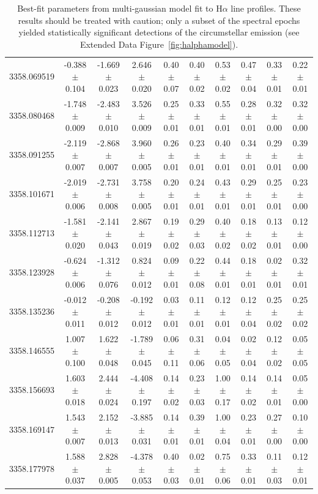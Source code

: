 \documentclass{nature3}
\begin{document}
\begin{methods}
\begin{table}
\begin{tabular}{lccccccccc}
  3358.069519 & -0.388 $\pm$ 0.104 & -1.669 $\pm$ 0.023 & 2.646 $\pm$ 0.020 & 0.40 $\pm$ 0.07 & 0.40 $\pm$ 0.02 & 0.53 $\pm$ 0.02 & 0.47 $\pm$ 0.04 & 0.33 $\pm$ 0.01 & 0.22 $\pm$ 0.01 \\
  3358.080468 & -1.748 $\pm$ 0.009 & -2.483 $\pm$ 0.010 & 3.526 $\pm$ 0.009 & 0.25 $\pm$ 0.01 & 0.33 $\pm$ 0.01 & 0.55 $\pm$ 0.01 & 0.28 $\pm$ 0.01 & 0.32 $\pm$ 0.00 & 0.32 $\pm$ 0.00 \\
  3358.091255 & -2.119 $\pm$ 0.007 & -2.868 $\pm$ 0.007 & 3.960 $\pm$ 0.005 & 0.26 $\pm$ 0.01 & 0.23 $\pm$ 0.01 & 0.40 $\pm$ 0.01 & 0.34 $\pm$ 0.01 & 0.29 $\pm$ 0.01 & 0.39 $\pm$ 0.00 \\
  3358.101671 & -2.019 $\pm$ 0.006 & -2.731 $\pm$ 0.008 & 3.758 $\pm$ 0.005 & 0.20 $\pm$ 0.01 & 0.24 $\pm$ 0.01 & 0.43 $\pm$ 0.01 & 0.29 $\pm$ 0.01 & 0.25 $\pm$ 0.01 & 0.23 $\pm$ 0.00 \\
  3358.112713 & -1.581 $\pm$ 0.020 & -2.141 $\pm$ 0.043 & 2.867 $\pm$ 0.019 & 0.19 $\pm$ 0.02 & 0.29 $\pm$ 0.03 & 0.40 $\pm$ 0.02 & 0.18 $\pm$ 0.02 & 0.13 $\pm$ 0.01 & 0.12 $\pm$ 0.00 \\
  3358.123928 & -0.624 $\pm$ 0.006 & -1.312 $\pm$ 0.076 & 0.824 $\pm$ 0.012 & 0.09 $\pm$ 0.01 & 0.22 $\pm$ 0.08 & 0.44 $\pm$ 0.01 & 0.18 $\pm$ 0.01 & 0.02 $\pm$ 0.01 & 0.32 $\pm$ 0.01 \\
  3358.135236 & -0.012 $\pm$ 0.011 & -0.208 $\pm$ 0.012 & -0.192 $\pm$ 0.012 & 0.03 $\pm$ 0.01 & 0.11 $\pm$ 0.01 & 0.12 $\pm$ 0.01 & 0.12 $\pm$ 0.04 & 0.25 $\pm$ 0.02 & 0.25 $\pm$ 0.02 \\
  3358.146555 & 1.007 $\pm$ 0.100 & 1.622 $\pm$ 0.048 & -1.789 $\pm$ 0.045 & 0.06 $\pm$ 0.11 & 0.31 $\pm$ 0.06 & 0.04 $\pm$ 0.05 & 0.02 $\pm$ 0.04 & 0.12 $\pm$ 0.02 & 0.05 $\pm$ 0.05 \\
  3358.156693 & 1.603 $\pm$ 0.018 & 2.444 $\pm$ 0.024 & -4.408 $\pm$ 0.197 & 0.14 $\pm$ 0.02 & 0.23 $\pm$ 0.03 & 1.00 $\pm$ 0.17 & 0.14 $\pm$ 0.02 & 0.14 $\pm$ 0.01 & 0.05 $\pm$ 0.00 \\
  3358.169147 & 1.543 $\pm$ 0.007 & 2.152 $\pm$ 0.013 & -3.885 $\pm$ 0.031 & 0.14 $\pm$ 0.01 & 0.39 $\pm$ 0.01 & 1.00 $\pm$ 0.04 & 0.23 $\pm$ 0.01 & 0.27 $\pm$ 0.00 & 0.10 $\pm$ 0.00 \\
  3358.177978 & 1.588 $\pm$ 0.037 & 2.828 $\pm$ 0.005 & -4.378 $\pm$ 0.053 & 0.40 $\pm$ 0.03 & 0.02 $\pm$ 0.01 & 0.75 $\pm$ 0.06 & 0.33 $\pm$ 0.01 & 0.11 $\pm$ 0.03 & 0.12 $\pm$ 0.01 \\
  \hline
  \end{tabular}
  \caption{Best-fit parameters from multi-gaussian model fit to H$\alpha$ line
  profiles.  These results should be treated with caution; only a
  subset of the spectral epochs yielded statistically significant
  detections of the circumstellar emission (see Extended Data
  Figure~\ref{fig:halphamodel}).}
  \label{tab:halphamodelparams}
\end{table}


\end{methods}
\end{document}
